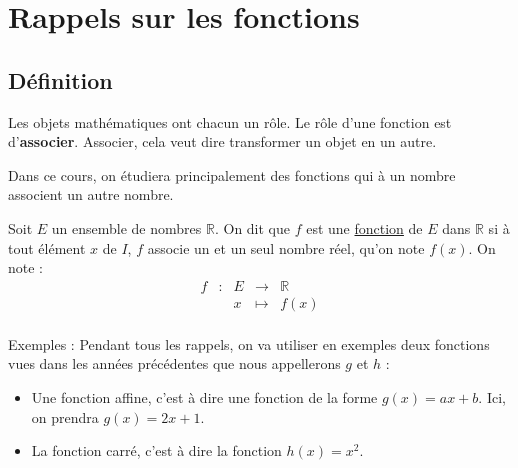 \documentclass[10pt,a4paper]{book}
\newcommand{\R}{\mathbb{R}}
\begin{document}
\section{Rappels sur les fonctions}



\subsection{Définition}

Les objets mathématiques ont chacun un rôle. Le rôle d'une fonction est d'\textbf{associer}. Associer, cela veut dire transformer un objet en un autre.

Dans ce cours, on étudiera principalement des fonctions qui à un nombre associent un autre nombre. 

\begin{de}
    Soit $E$ un ensemble de nombres $\R$. On dit que $f$ est une \underline{fonction} de $E$ dans $\R$ si à tout élément $x$ de $I$,  $f$ associe un et un seul nombre réel, qu'on note $f(x)$.
    On note :
        \[
        \begin{array}{ccccc}
        f & : & E & \to & \R \\
         & & x & \mapsto & f(x) \\
        \end{array}
        \]
\end{de}

Exemples : Pendant tous les rappels, on va utiliser en exemples deux fonctions vues dans les années précédentes que nous appellerons $g$ et $h$ :
\begin{itemize}
    \item Une fonction affine, c'est à dire une fonction de la forme $g(x)=ax+b$. Ici, on prendra $g(x)=2x+1$.
    \item La fonction carré, c'est à dire la fonction $h(x)=x^2$.
\end{itemize}
\end{document}
